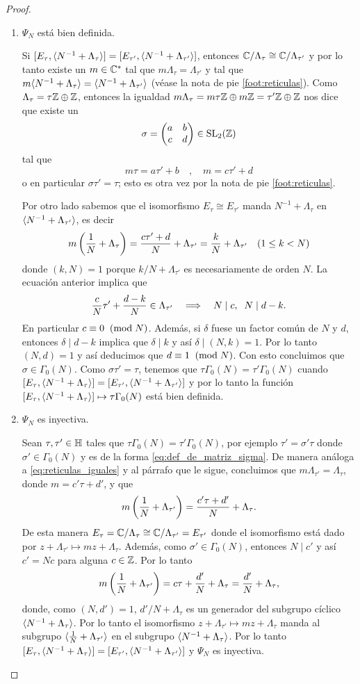 \documentclass[../../tesis_maestria]{subfiles}
\begin{document}
\begin{proof}
\begin{enumerate}[label=\emph{\roman*})]
  \item $\Psi_N$ está bien definida.
  
  \-\;\;Si $[E_\tau,\langle N^{-1}+\Lambda_\tau \rangle]=[E_{\tau'},\langle N^{-1}+\Lambda_{\tau'} \rangle]$, entonces $\mathbb{C}/\Lambda_\tau\cong\mathbb{C}/\Lambda_{\tau'}$ y por lo tanto existe un $m\in\mathbb{C}^*$ tal que $m\Lambda_\tau=\Lambda_{\tau'}$ y tal que $m\langle N^{-1}+\Lambda_\tau \rangle=\langle N^{-1}+\Lambda_{\tau'} \rangle$ (véase la nota de pie \ref{foot:reticulas}). Como $\Lambda_\tau=\tau\mathbb{Z}\oplus\mathbb{Z}$, entonces la igualdad $m\Lambda_\tau=m\tau\mathbb{Z}\oplus m\mathbb{Z}=\tau'\mathbb{Z}\oplus\mathbb{Z}$ nos dice que existe un
\[
	\sigma=\begin{pmatrix}a & b\\ c & d\end{pmatrix}\in\mathrm{SL}_2(\mathbb{Z})
\]
tal que
\[
	m\tau=a\tau'+b\quad,\quad m=c\tau'+d
\]
o en particular $\sigma\tau'=\tau$; esto es otra vez por la nota de pie \ref{foot:reticulas}.

  \-\;\; Por otro lado sabemos que el isomorfismo $E_\tau\cong E_{\tau'}$ manda $N^{-1}+\Lambda_\tau$ en $\langle N^{-1}+\Lambda_{\tau'} \rangle$, es decir
\[
	m\left( \frac{1}{N}+\Lambda_\tau \right)=\frac{c\tau'+d}{N}+\Lambda_{\tau'}=\frac{k}{N}+\Lambda_{\tau'}\quad (1\leq k< N)
\]
donde $(k,N)=1$ porque $k/N+\Lambda_{\tau'}$ es necesariamente de orden $N$. La ecuación anterior implica que
\[
	\frac{c}{N}\tau'+\frac{d-k}{N}\in\Lambda_{\tau'}\quad\Longrightarrow\quad N\mid c,\;\; N\mid d-k.
\]
En particular $c\equiv0\;\;(\mathrm{mod}\; N)$. Adem\'as, si $\delta$ fuese un factor común de $N$ y $d$, entonces $\delta\mid d-k$ implica que $\delta\mid k$ y así $\delta\mid(N,k)=1$. Por lo tanto $(N,d)=1$ y así deducimos que $d\equiv1\;\;(\mathrm{mod}\; N)$. Con esto concluimos que $\sigma\in\Gamma_0(N)$. Como $\sigma\tau'=\tau$, tenemos que $\tau\Gamma_0(N)=\tau'\Gamma_0(N)$ cuando $[E_\tau,\langle N^{-1}+\Lambda_\tau \rangle]=[E_{\tau'},\langle N^{-1}+\Lambda_{\tau'} \rangle]$ y por lo tanto la función $[E_\tau,\langle N^{-1}+\Lambda_\tau \rangle]\mapsto\tau\Gamma_0(N)$ está bien definida.

  \item $\Psi_N$ es inyectiva.
  
  \-\;\; Sean $\tau,\tau'\in\mathbb{H}$ tales que $\tau\Gamma_0(N)=\tau'\Gamma_0(N)$, por ejemplo $\tau'=\sigma'\tau$ donde $\sigma'\in\Gamma_0(N)$ y es de la forma \eqref{eq:def_de_matriz_sigma}. De manera análoga a \eqref{eq:reticulas_iguales} y al párrafo que le sigue, concluimos que $m\Lambda_{\tau'}=\Lambda_{\tau}$, donde $m=c'\tau+d'$, y que
  \[
  	m\left( \frac{1}{N}+\Lambda_{\tau'} \right)=\frac{c'\tau+d'}{N}+\Lambda_\tau.
  \]
De esta manera $E_\tau=\mathbb{C}/\Lambda_\tau\cong\mathbb{C}/\Lambda_{\tau'}=E_{\tau'}$ donde el isomorfismo está dado por $z+\Lambda_{\tau'}\mapsto mz+\Lambda_{\tau}$. Además, como $\sigma'\in\Gamma_0(N)$, entonces $N\mid c'$ y así $c'=Nc$ para alguna $c\in\mathbb{Z}$. Por lo tanto
\[
  m\left( \frac{1}{N}+\Lambda_{\tau'} \right)=c\tau+\frac{d'}{N}+\Lambda_\tau=\frac{d'}{N}+\Lambda_\tau,
\]
donde, como $(N,d')=1$, $d'/N+\Lambda_\tau$ es un generador del subgrupo cíclico $\langle N^{-1}+\Lambda_\tau \rangle$. Por lo tanto el isomorfismo $z+\Lambda_{\tau'}\mapsto mz+\Lambda_{\tau}$ manda al subgrupo $\langle \frac{1}{N}+\Lambda_{\tau'} \rangle$ en el subgrupo $\langle N^{-1}+\Lambda_\tau \rangle$. Por lo tanto $[E_\tau,\langle N^{-1}+\Lambda_\tau \rangle]=[E_{\tau'},\langle N^{-1}+\Lambda_{\tau'} \rangle]$ y $\Psi_N$ es inyectiva.


\end{enumerate}
\end{proof}
\end{document}
